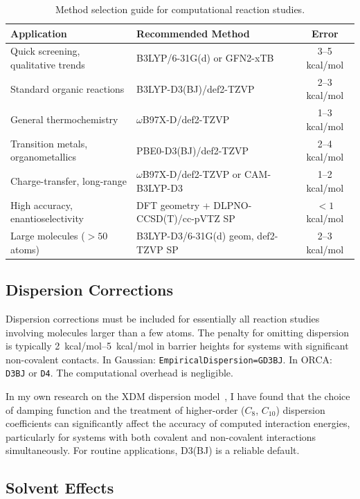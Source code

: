 \documentclass[11pt]{article}
\numberwithin{equation}{section}
\begin{document}
\begin{table}[h]
\centering
\caption{Method selection guide for computational reaction studies.}
\label{tab:methods}
\begin{tabular}{p{4.5cm}p{5.5cm}c}
\toprule
\textbf{Application} & \textbf{Recommended Method} & \textbf{Error} \\
\midrule
Quick screening, qualitative trends & B3LYP/6-31G(d) or GFN2-xTB & 3--5 kcal/mol \\
Standard organic reactions & B3LYP-D3(BJ)/def2-TZVP & 2--3 kcal/mol \\
General thermochemistry & $\omega$B97X-D/def2-TZVP & 1--3 kcal/mol \\
Transition metals, organometallics & PBE0-D3(BJ)/def2-TZVP & 2--4 kcal/mol \\
Charge-transfer, long-range & $\omega$B97X-D/def2-TZVP or CAM-B3LYP-D3 & 1--2 kcal/mol \\
High accuracy, enantioselectivity & DFT geometry + DLPNO-CCSD(T)/cc-pVTZ SP & ${<}1$ kcal/mol \\
Large molecules (${>}50$ atoms) & B3LYP-D3/6-31G(d) geom, def2-TZVP SP & 2--3 kcal/mol \\
\bottomrule
\end{tabular}
\end{table}

\subsection{Dispersion Corrections}

Dispersion corrections must be included for essentially all reaction studies involving molecules larger than a few atoms. The penalty for omitting dispersion is typically \SIrange{2}{5}{kcal/mol} in barrier heights for systems with significant non-covalent contacts. In Gaussian: \texttt{EmpiricalDispersion=GD3BJ}. In ORCA: \texttt{D3BJ} or \texttt{D4}. The computational overhead is negligible.

In my own research on the XDM dispersion model~\cite{PriceXDM2023,PriceDispersion2021}, I have found that the choice of damping function and the treatment of higher-order ($C_8$, $C_{10}$) dispersion coefficients can significantly affect the accuracy of computed interaction energies, particularly for systems with both covalent and non-covalent interactions simultaneously. For routine applications, D3(BJ) is a reliable default.

\subsection{Solvent Effects}
\end{document}
